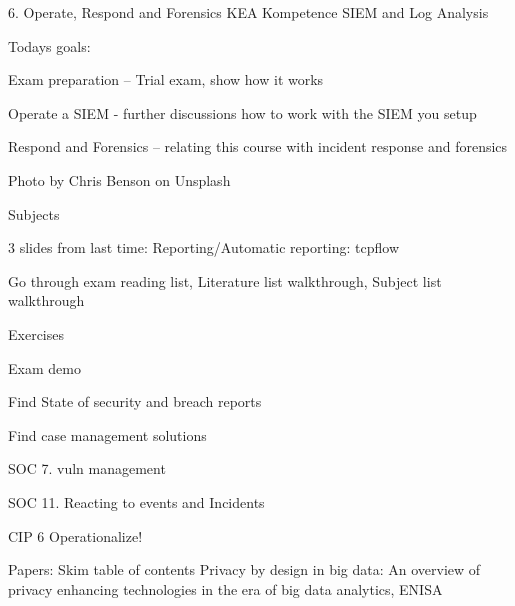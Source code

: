 \documentclass[Screen16to9,17pt]{foils}
\begin{document}
\mytitlepage
{6. Operate, Respond and Forensics}
{KEA Kompetence SIEM and Log Analysis}





Todays goals:
\begin{list2}
\item Exam preparation --  Trial exam, show how it works
\item Operate a SIEM - further discussions how to work with the SIEM you setup
\item Respond and Forensics -- relating this course with incident response and forensics
\end{list2}

 Photo by Chris Benson on Unsplash


\begin{list1}
\item Subjects
\begin{list2}
\item  3 slides from last time: Reporting/Automatic reporting: tcpflow
\item Go through exam reading list, Literature list walkthrough, Subject list walkthrough
\end{list2}
\item Exercises
\begin{list2}
\item Exam demo
\item Find State of security and breach reports
\item Find case management solutions
\end{list2}
\end{list1}


\begin{list1}
\item SOC 7. vuln management
\item SOC 11. Reacting to events and Incidents
\item CIP 6 Operationalize!
\item Papers: Skim table of contents Privacy by design in big data: An overview of privacy enhancing technologies in the era of big data analytics, ENISA
\item
\end{list1}


\end{document}
